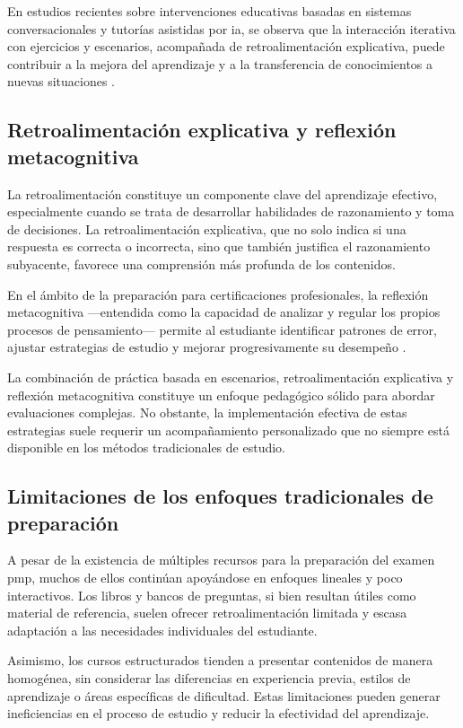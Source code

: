 En estudios recientes sobre intervenciones educativas basadas en sistemas conversacionales y tutorías asistidas por \gls{ia}, se observa que la interacción iterativa con ejercicios y escenarios, acompañada de retroalimentación explicativa, puede contribuir a la mejora del aprendizaje y a la transferencia de conocimientos a nuevas situaciones \parencite{deng2024chatgpt, kestin2025ai}.

\subsection{Retroalimentación explicativa y reflexión metacognitiva}

La retroalimentación constituye un componente clave del aprendizaje efectivo, especialmente cuando se trata de desarrollar habilidades de razonamiento y toma de decisiones. La retroalimentación explicativa, que no solo indica si una respuesta es correcta o incorrecta, sino que también justifica el razonamiento subyacente, favorece una comprensión más profunda de los contenidos.

En el ámbito de la preparación para certificaciones profesionales, la reflexión metacognitiva —entendida como la capacidad de analizar y regular los propios procesos de pensamiento— permite al estudiante identificar patrones de error, ajustar estrategias de estudio y mejorar progresivamente su desempeño \parencite{kasneci2023chatgpt, deng2024chatgpt}.

La combinación de práctica basada en escenarios, retroalimentación explicativa y reflexión metacognitiva constituye un enfoque pedagógico sólido para abordar evaluaciones complejas. No obstante, la implementación efectiva de estas estrategias suele requerir un acompañamiento personalizado que no siempre está disponible en los métodos tradicionales de estudio.

\subsection{Limitaciones de los enfoques tradicionales de preparación}

A pesar de la existencia de múltiples recursos para la preparación del examen \gls{pmp}, muchos de ellos continúan apoyándose en enfoques lineales y poco interactivos. Los libros y bancos de preguntas, si bien resultan útiles como material de referencia, suelen ofrecer retroalimentación limitada y escasa adaptación a las necesidades individuales del estudiante.

Asimismo, los cursos estructurados tienden a presentar contenidos de manera homogénea, sin considerar las diferencias en experiencia previa, estilos de aprendizaje o áreas específicas de dificultad. Estas limitaciones pueden generar ineficiencias en el proceso de estudio y reducir la efectividad del aprendizaje.

